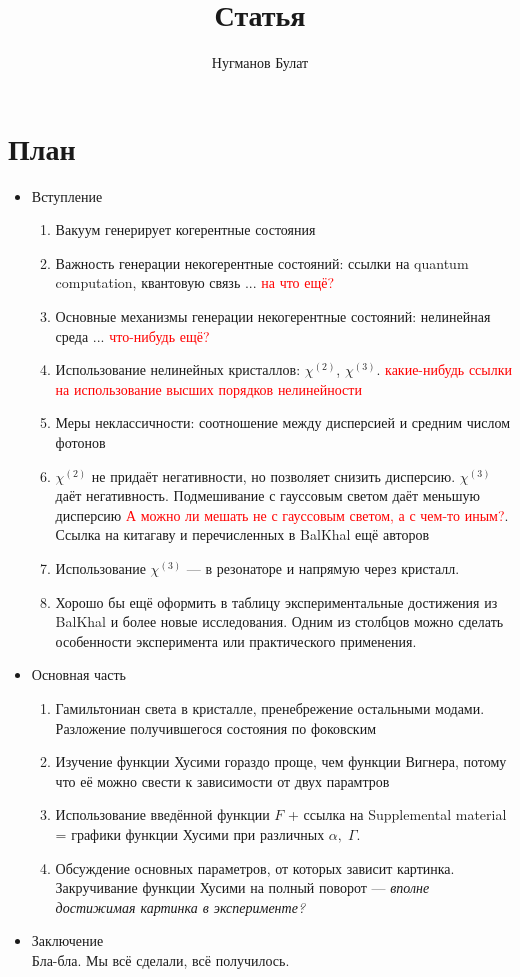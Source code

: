 \documentclass[a4paper, 12pt]{article}
\author{Нугманов Булат}
\title{Статья}
\begin{document}
\maketitle
\section*{План}
\begin{itemize}
    \item Вступление 
    \begin{enumerate}
        \item Вакуум генерирует когерентные состояния
        \item Важность генерации некогерентные состояний: ссылки на quantum computation, квантовую связь ... \textcolor{red}{на что ещё?}
        \item Основные механизмы генерации некогерентные состояний: нелинейная среда ... \textcolor{red}{что-нибудь ещё?}
        \item Использование нелинейных кристаллов: $\chi^{(2)}$, $\chi^{(3)}$. \textcolor{red}{какие-нибудь ссылки на использование высших порядков нелинейности}
        \item Меры неклассичности: соотношение между дисперсией и средним числом фотонов
        \item $\chi^{(2)}$ не придаёт негативности, но позволяет снизить дисперсию. $\chi^{(3)}$ даёт негативность. Подмешивание с гауссовым светом даёт меньшую дисперсию \textcolor{red}{А можно ли мешать не с гауссовым светом, а с чем-то иным?}. Ссылка на китагаву и перечисленных в BalKhal ещё авторов
        \item Использование $\chi^{(3)}$ --- в резонаторе и напрямую через кристалл. 
        \item Хорошо бы ещё оформить в таблицу экспериментальные достижения из BalKhal и более новые исследования. Одним из столбцов можно сделать особенности эксперимента или практического применения.
    \end{enumerate}
    \item Основная часть
    \begin{enumerate}
        \item Гамильтониан света в кристалле, пренебрежение остальными модами. Разложение получившегося состояния по фоковским
        \item Изучение функции Хусими гораздо проще, чем функции Вигнера, потому что её можно свести к зависимости от двух парамтров
        \item Использование введённой функции $F$ + ссылка на Supplemental material = графики функции Хусими при различных $\alpha, \; \Gamma$.
        \item Обсуждение основных параметров, от которых зависит картинка. Закручивание функции Хусими на полный поворот --- \textit{вполне достижимая картинка в эксперименте?}
    \end{enumerate}
    \item Заключение\\
    Бла-бла. Мы всё сделали, всё получилось.
\end{itemize}
\end{document}
